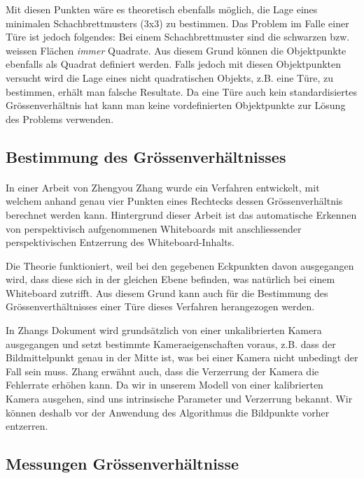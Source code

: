 Mit diesen Punkten wäre es theoretisch ebenfalls möglich, die Lage eines minimalen Schachbrettmusters (3x3) zu bestimmen. Das Problem im Falle einer Türe ist jedoch folgendes: Bei einem Schachbrettmuster sind die schwarzen bzw. weissen Flächen \textit{immer} Quadrate. Aus diesem Grund können die Objektpunkte ebenfalls als Quadrat definiert werden. Falls jedoch mit diesen Objektpunkten versucht wird die Lage eines nicht quadratischen Objekts, z.B. eine Türe, zu bestimmen, erhält man falsche Resultate. Da eine Türe auch kein standardisiertes Grössenverhältnis hat kann man keine vordefinierten Objektpunkte zur Lösung des Problems verwenden.

\subsection{Bestimmung des Grössenverhältnisses}


\paragraph{}
In einer Arbeit von Zhengyou Zhang \cite{zhangrectification} wurde ein Verfahren entwickelt, mit welchem anhand genau vier Punkten eines Rechtecks dessen Grössenverhältnis berechnet werden kann. Hintergrund dieser Arbeit ist das automatische Erkennen von perspektivisch aufgenommenen Whiteboards mit anschliessender perspektivischen Entzerrung des Whiteboard-Inhalts.

Die Theorie funktioniert, weil bei den gegebenen Eckpunkten davon ausgegangen wird, dass diese sich in der gleichen Ebene befinden, was natürlich bei einem Whiteboard zutrifft. Aus diesem Grund kann auch für die Bestimmung des Grössenverthältnisses einer Türe dieses Verfahren herangezogen werden.

In Zhangs Dokument wird grundsätzlich von einer unkalibrierten Kamera ausgegangen und setzt bestimmte Kameraeigenschaften voraus, z.B. dass der Bildmittelpunkt genau in der Mitte ist, was bei einer Kamera nicht unbedingt der Fall sein muss. Zhang erwähnt auch, dass die Verzerrung der Kamera die Fehlerrate erhöhen kann. Da wir in unserem Modell von einer kalibrierten Kamera ausgehen, sind uns intrinsische Parameter und Verzerrung bekannt. Wir können deshalb vor der Anwendung des Algorithmus die Bildpunkte vorher entzerren.


\subsection{Messungen Grössenverhältnisse}

